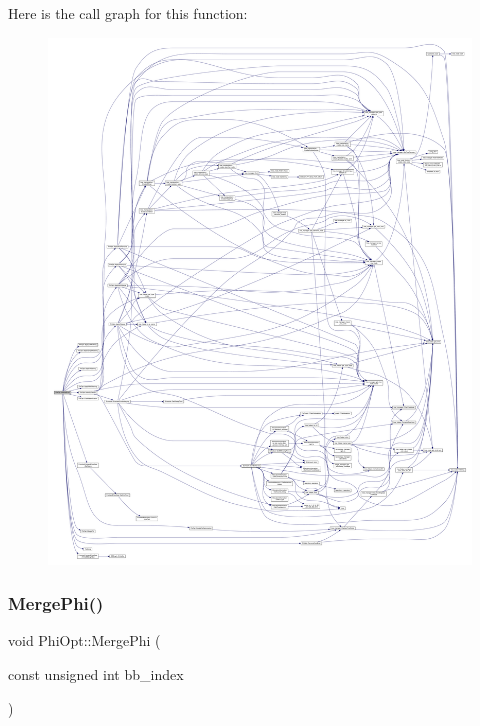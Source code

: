 Here is the call graph for this function\+:
\nopagebreak
\begin{figure}[H]
\begin{center}
\leavevmode
\includegraphics[width=350pt]{dc/ddf/classPhiOpt_aad12a9928fb1f1b7a28777c4480a31f4_cgraph}
\end{center}
\end{figure}
\mbox{\label{classPhiOpt_a8a350fb310bb1fccdc1be60e764c994f}} 
\subsubsection{\texorpdfstring{Merge\+Phi()}{MergePhi()}}
{\footnotesize\ttfamily void Phi\+Opt\+::\+Merge\+Phi (\begin{DoxyParamCaption}\item[{const unsigned int}]{bb\+\_\+index }\end{DoxyParamCaption})\hspace{0.3cm}{\ttfamily [private]}}



